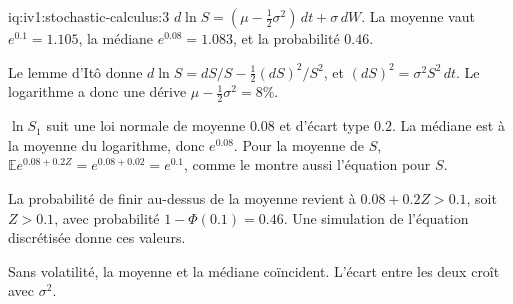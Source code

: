 \begin{solution}{iq:iv1:stochastic-calculus:3}
$d\ln S = (\mu - \frac12\sigma^2)\,dt + \sigma\,dW$. La moyenne vaut $e^{0.1} = 1.105$, la médiane $e^{0.08} = 1.083$, et la probabilité $0.46$.

Le lemme d'Itô donne $d\ln S = dS/S - \frac12(dS)^2/S^2$, et $(dS)^2 = \sigma^2S^2\,dt$. Le logarithme a donc une dérive $\mu - \frac12\sigma^2 = 8\%$.

$\ln S_1$ suit une loi normale de moyenne $0.08$ et d'écart type $0.2$. La médiane est à la moyenne du logarithme, donc $e^{0.08}$. Pour la moyenne de $S$, $\mathbb{E}e^{0.08 + 0.2Z} = e^{0.08 + 0.02} = e^{0.1}$, comme le montre aussi l'équation pour $S$.

La probabilité de finir au-dessus de la moyenne revient à $0.08 + 0.2Z > 0.1$, soit $Z > 0.1$, avec probabilité $1 - \Phi(0.1) = 0.46$. Une simulation de l'équation discrétisée donne ces valeurs.

Sans volatilité, la moyenne et la médiane coïncident. L'écart entre les deux croît avec $\sigma^2$.



\end{solution}

